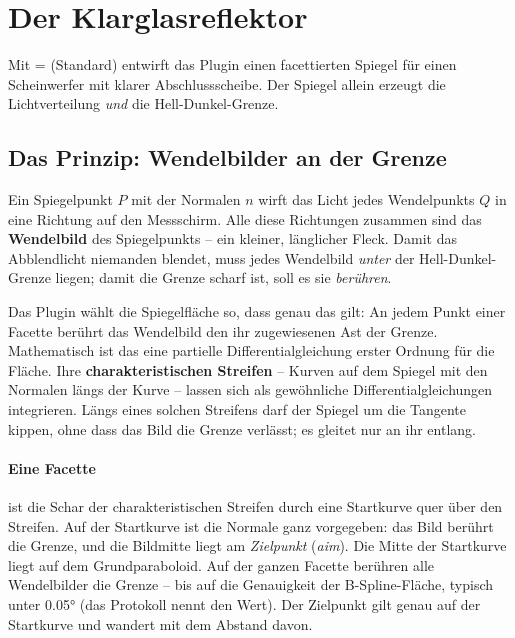 \section{Der Klarglasreflektor}\label{sec:al-klarglas}

Mit  =  (Standard) entwirft das Plugin einen
facettierten Spiegel für einen Scheinwerfer mit klarer Abschlussscheibe. Der Spiegel allein erzeugt
die Lichtverteilung \emph{und} die Hell-Dunkel-Grenze.

\subsection{Das Prinzip: Wendelbilder an der Grenze}\label{sec:al-prinzip}

Ein Spiegelpunkt $P$ mit der Normalen $n$ wirft das Licht jedes Wendelpunkts $Q$ in eine Richtung
auf den Messschirm. Alle diese Richtungen zusammen sind das \textbf{Wendelbild} des Spiegelpunkts --
ein kleiner, länglicher Fleck. Damit das Abblendlicht niemanden blendet, muss jedes Wendelbild
\emph{unter} der Hell-Dunkel-Grenze liegen; damit die Grenze scharf ist, soll es sie
\emph{berühren}.

Das Plugin wählt die Spiegelfläche so, dass genau das gilt: An jedem Punkt einer Facette berührt das
Wendelbild den ihr zugewiesenen Ast der Grenze. Mathematisch ist das eine partielle
Differentialgleichung erster Ordnung für die Fläche. Ihre \textbf{charakteristischen Streifen} --
Kurven auf dem Spiegel mit den Normalen längs der Kurve -- lassen sich als gewöhnliche
Differentialgleichungen integrieren. Längs eines solchen Streifens darf der Spiegel um die Tangente
kippen, ohne dass das Bild die Grenze verlässt; es gleitet nur an ihr entlang.

\paragraph{Eine Facette} ist die Schar der charakteristischen Streifen durch eine Startkurve quer
über den Streifen. Auf der Startkurve ist die Normale ganz vorgegeben: das Bild berührt die Grenze,
und die Bildmitte liegt am \emph{Zielpunkt} (\emph{aim}). Die Mitte der Startkurve liegt auf dem
Grundparaboloid. Auf der ganzen Facette berühren alle Wendelbilder die Grenze -- bis auf die
Genauigkeit der B-Spline-Fläche, typisch unter \ang{0.05} (das Protokoll nennt den Wert). Der
Zielpunkt gilt genau auf der Startkurve und wandert mit dem Abstand davon.

